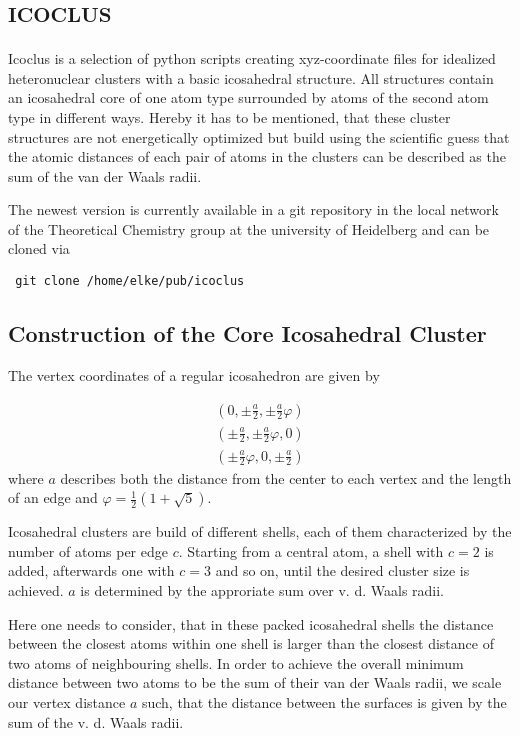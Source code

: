 \section{\textsc{icoclus}}
\label{icoclus}

Icoclus is a selection of python scripts creating xyz-coordinate
files for idealized heteronuclear clusters with a basic
icosahedral structure.
All structures contain an icosahedral core of one atom type
surrounded by atoms of the second atom type in different ways.
Hereby it has to be mentioned, that these cluster structures are not
energetically optimized but build using the scientific guess
that the atomic distances of each pair of atoms in the clusters
can be described as the sum of the van der Waals
radii.

The newest version is currently available in a git repository in the local
network of the Theoretical Chemistry group at the university of
Heidelberg and can be cloned via
\begin{verbatim}
 git clone /home/elke/pub/icoclus 
\end{verbatim}


\subsection{Construction of the Core Icosahedral Cluster}
The vertex coordinates of a regular icosahedron are given by

\begin{align}
  \left(  0 , \pm \frac a2 ,  \pm\frac a2 \varphi \right) \nonumber\\
  \left(  \pm\frac a2 , \pm \frac a2 \varphi ,  0 \right) \nonumber\\
  \left(  \pm \frac a2 \varphi , 0 ,  \pm\frac a2 \right)
\end{align}
where $a$ describes both the distance from the center to each vertex
and the length of an edge and $\varphi = \frac 12 (1+\sqrt{5})$.

Icosahedral clusters are build of different shells, each of them
characterized by the number of atoms per edge $c$. Starting from a
central atom, a shell with $c=2$ is added, afterwards one with $c=3$
and so on, until the desired cluster size is achieved.
$a$ is determined by the approriate sum over v. d. Waals radii.

Here one needs to consider, that in these packed icosahedral shells
the distance between the closest atoms within one shell is
larger than the closest distance of two atoms of neighbouring shells.
In order to achieve the overall minimum distance between two atoms
to be the sum of their van der Waals radii, we scale our vertex
distance $a$ such, that the distance between the surfaces is given by
the sum of the v. d. Waals radii.

